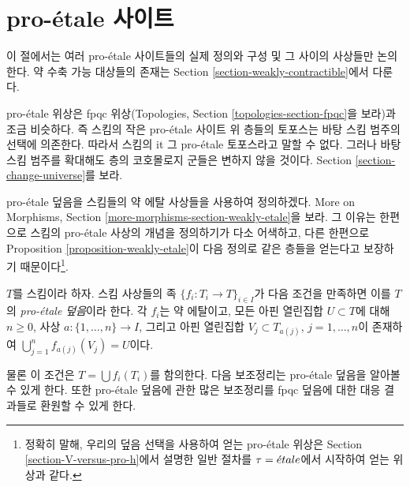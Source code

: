 \section{pro-\'etale 사이트}
\label{section-proetale}

\noindent
이 절에서는 여러 pro-\'etale 사이트들의 실제 정의와 구성 및 그 사이의
사상들만 논의한다. 약 수축 가능 대상들의 존재는 Section
\ref{section-weakly-contractible}에서 다룬다.

\medskip\noindent
pro-\'etale 위상은 fpqc 위상(Topologies, Section
\ref{topologies-section-fpqc}을 보라)과 조금 비슷하다. 즉 스킴의 작은
pro-\'etale 사이트 위 층들의 토포스는 바탕 스킴 범주의 선택에 의존한다.
따라서 스킴의 {it 그} pro-\'etale 토포스라고 말할 수 없다.
그러나 바탕 스킴 범주를 확대해도 층의 코호몰로지 군들은 변하지 않을 것이다.
Section \ref{section-change-universe}를 보라.

\medskip\noindent
pro-\'etale 덮음을 스킴들의 약 에탈 사상들을 사용하여 정의하겠다.
More on Morphisms, Section \ref{more-morphisms-section-weakly-etale}을 보라.
그 이유는 한편으로 스킴의 pro-\'etale 사상의 개념을 정의하기가 다소
어색하고, 다른 한편으로 Proposition \ref{proposition-weakly-etale}이
다음 정의로 같은 층들을 얻는다고 보장하기 때문이다\footnote{정확히 말해,
우리의 덮음 선택을 사용하여 얻는 pro-\'etale 위상은 Section
\ref{section-V-versus-pro-h}에서 설명한 일반 절차를 $\tau = {\acute{e}tale}$에서
시작하여 얻는 위상과 같다.}.

\begin{definition}
\label{definition-fpqc-covering}
$T$를 스킴이라 하자. 스킴 사상들의 족
$\{f_i : T_i \to T\}_{i \in I}$가 다음 조건을 만족하면
이를 $T$의 {\it pro-\'etale 덮음}이라 한다. 각 $f_i$는 약 에탈이고,
모든 아핀 열린집합 $U \subset T$에 대해 $n \geq 0$, 사상
$a : \{1, \ldots, n\} \to I$, 그리고 아핀 열린집합
$V_j \subset T_{a(j)}$, $j = 1, \ldots, n$이 존재하여
$\bigcup_{j = 1}^n f_{a(j)}(V_j) = U$이다.
\end{definition}

\noindent
물론 이 조건은 $T = \bigcup f_i(T_i)$를 함의한다.
다음 보조정리는 pro-\'etale 덮음을 알아볼 수 있게 한다.
또한 pro-\'etale 덮음에 관한 많은 보조정리를 fpqc 덮음에 대한
대응 결과들로 환원할 수 있게 한다.


